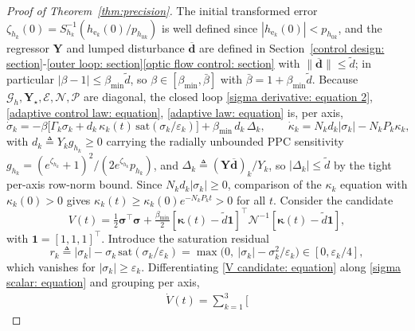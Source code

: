 \documentclass{IEEEtaes}
\theoremstyle{definition}
\theoremstyle{remark}
\begin{document}
\begin{proof}[Proof of Theorem~\ref{thm:precision}] The initial transformed error $\zeta_{h_k}(0) = S_{h_k}^{-1}(h_{\text{e}_k}(0)/p_{h_{0k}})$ is well defined since $|h_{\text{e}_k}(0)|<p_{h_{0k}}$, and the regressor $\boldsymbol{Y}$ and lumped disturbance $\boldsymbol{\overline{d}}$ are defined in Section~\ref{control design: section}-\ref{outer loop: section}\ref{optic flow control: section} with $\|\boldsymbol{\overline{d}}\|\le\tilde{d}$; in particular $|\beta-1|\le\beta_{\min}\tilde{d}$, so $\beta\in[\beta_{\min},\bar{\beta}]$ with $\bar{\beta}=1+\beta_{\min}\tilde{d}$. Because $\mathcal{G}_h,\boldsymbol{Y}_\star,\mathcal{E},\mathcal{N},\mathcal{P}$ are diagonal, the closed loop \eqref{sigma derivative: equation 2}, \eqref{adaptive control law: equation}, \eqref{adaptive law: equation} is, per axis,
\begin{equation} \label{sigma scalar: equation}
    \dot{\sigma}_k = -\beta\big[\Gamma_k\sigma_k + d_k\,\kappa_k(t)\,\text{sat}(\sigma_k/\varepsilon_k)\big] + \beta_{\min}\,d_k\,\Delta_k,\qquad
    \dot{\kappa}_k = N_k d_k|\sigma_k| - N_k P_k\kappa_k,
\end{equation}
with $d_k\triangleq Y_k g_{h_k}\ge0$ carrying the radially unbounded PPC sensitivity $g_{h_k}=(e^{\zeta_{h_k}}+1)^2/(2e^{\zeta_{h_k}}p_{h_k})$, and $\Delta_k\triangleq(\boldsymbol{Y}\boldsymbol{\overline{d}})_k/Y_k$, so $|\Delta_k|\le\tilde{d}$ by the tight per-axis row-norm bound. Since $N_k d_k|\sigma_k|\ge0$, comparison of the $\kappa_k$ equation with $\kappa_k(0)>0$ gives $\kappa_k(t)\ge\kappa_k(0)e^{-N_k P_k t}>0$ for all $t$. Consider the candidate
\begin{equation} \label{V candidate: equation}
    V(t) = \tfrac12\boldsymbol{\sigma}^\top\boldsymbol{\sigma} + \tfrac{\beta_{\min}}{2}[\boldsymbol{\kappa}(t)-\tilde{d}\boldsymbol{1}]^\top\mathcal{N}^{-1}[\boldsymbol{\kappa}(t)-\tilde{d}\boldsymbol{1}],
\end{equation}
with $\boldsymbol{1}=[1,1,1]^\top$. Introduce the saturation residual
\begin{equation*}
    r_k \triangleq |\sigma_k| - \sigma_k\,\text{sat}(\sigma_k/\varepsilon_k) = \max\!\big(0,\ |\sigma_k|-\sigma_k^2/\varepsilon_k\big)\in[0,\varepsilon_k/4],
\end{equation*}
which vanishes for $|\sigma_k|\ge\varepsilon_k$. Differentiating \eqref{V candidate: equation} along \eqref{sigma scalar: equation} and grouping per axis,
\begin{align} \label{Vdot exact: equation}
\dot{V}(t) = \sum_{k=1}^{3}\Big[

\end{align}
\end{proof}
\end{document}
